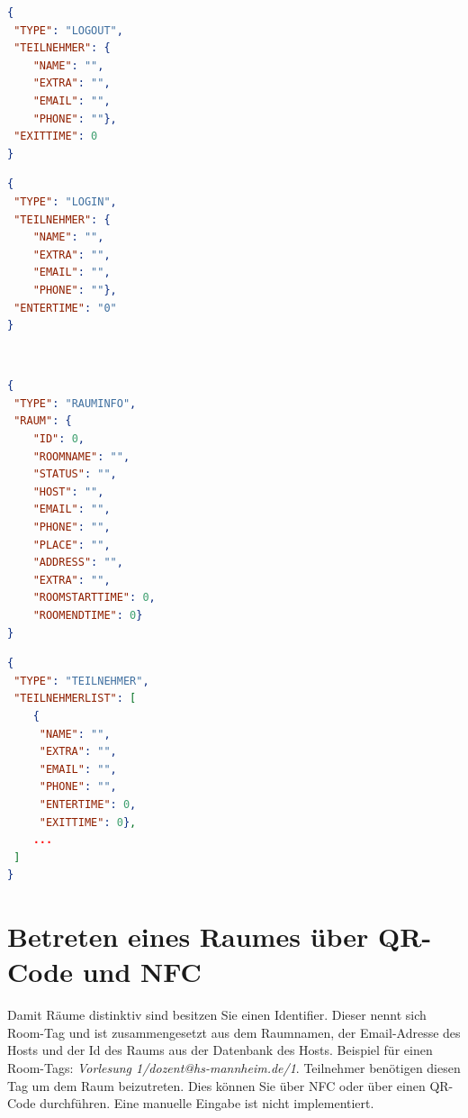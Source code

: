 \begin{minipage}[]{0.45\linewidth}
\begin{lstlisting}[language=json, label={lst:anmeldung}, caption={anmeldung.json}]
{
 "TYPE": "LOGOUT",
 "TEILNEHMER": {
	"NAME": "",
	"EXTRA": "",
	"EMAIL": "",
	"PHONE": ""},
 "EXITTIME": 0
}
\end{lstlisting}
\end{minipage}
\qquad
\begin{minipage}[]{0.45\linewidth}
\begin{lstlisting}[language=json,label={lst:abmeldung}, caption={abmeldung.json}]
{
 "TYPE": "LOGIN",
 "TEILNEHMER": {
	"NAME": "",
	"EXTRA": "",
	"EMAIL": "",
	"PHONE": ""},
 "ENTERTIME": "0"
}
\end{lstlisting}
\end{minipage}
\\
\begin{minipage}[]{0.45\linewidth}
\begin{lstlisting}[language=json, label={lst:rauminfo}, caption={rauminfo.json}]
{
 "TYPE": "RAUMINFO",
 "RAUM": {
	"ID": 0,
	"ROOMNAME": "",
	"STATUS": "",
	"HOST": "",
	"EMAIL": "",
	"PHONE": "",
	"PLACE": "",
	"ADDRESS": "",
	"EXTRA": "",
	"ROOMSTARTTIME": 0,
	"ROOMENDTIME": 0}
}
\end{lstlisting}
\end{minipage}
\qquad
\begin{minipage}[]{0.45\linewidth}
\begin{lstlisting}[language=json, label={lst:teilnehmer}, caption={teilnehmer.json}]
{
 "TYPE": "TEILNEHMER",
 "TEILNEHMERLIST": [
	{
	 "NAME": "",
	 "EXTRA": "",
 	 "EMAIL": "",
 	 "PHONE": "",
 	 "ENTERTIME": 0,
	 "EXITTIME": 0},
	...
 ]
}
\end{lstlisting}
\end{minipage}




\section{Betreten eines Raumes über QR-Code und NFC}
\label{sec:RoomTag - QR und NFC}
Damit Räume distinktiv sind besitzen Sie einen Identifier. Dieser nennt sich Room-Tag und ist zusammengesetzt aus dem Raumnamen, der Email-Adresse des Hosts und der Id des Raums aus der Datenbank des Hosts. 
Beispiel für einen Room-Tags: \textit{Vorlesung 1/dozent@hs-mannheim.de/1}.
Teilnehmer benötigen diesen Tag um dem Raum beizutreten. Dies können Sie über NFC oder über einen QR-Code durchführen. Eine manuelle Eingabe ist nicht implementiert. 

